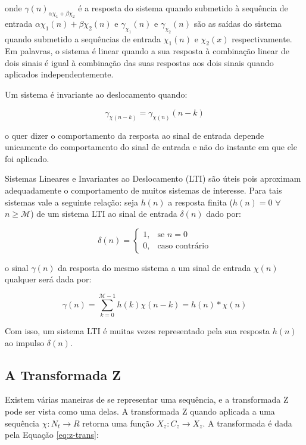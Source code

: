 {onde $\gamma(n)_{\alpha \chi_1 + \beta \chi_2}$ é a resposta do sistema quando submetido à
sequência de entrada $\alpha \chi_1(n) + \beta \chi_2(n)$ e $\gamma_{\chi_1}(n)$ e
$\gamma_{\chi_2}(n)$ são as saídas do sistema quando submetido a sequências de entrada
$\chi_1(n)$ e $\chi_2(x)$ respectivamente. Em palavras, o sistema é linear quando a
sua resposta à combinação linear de dois sinais é igual à combinação das
suas respostas aos dois sinais quando aplicados independentemente. 

Um sistema é invariante ao deslocamento quando:

\begin{equation}
\gamma_{\chi(n-k)} = \gamma_{\chi(n)}(n - k)
\end{equation}

o quer dizer o comportamento da resposta ao sinal de entrada depende unicamente
do comportamento do sinal de entrada e não do instante em que ele foi aplicado.

Sistemas Lineares e Invariantes ao Deslocamento (LTI) são úteis pois aproximam
adequadamente o comportamento de muitos sistemas de interesse. Para tais
sistemas vale a seguinte relação: seja $h(n)$ a resposta finita ($h(n) = 0$ $\forall$ $n \geq \mathcal{M}$) de um sistema  LTI ao sinal de entrada $\delta(n)$ dado por:

\begin{equation}
    \delta(n)= 
\begin{cases}
    1,& \text{se } n = 0\\
    0,              & \text{caso contrário}
\end{cases}
\end{equation}

o sinal $\gamma(n)$ da resposta do mesmo sistema a um sinal de entrada $\chi(n)$ qualquer
será dada por:

\begin{equation}
\gamma(n) = \sum_{k=0} ^{\mathcal{M}-1} h(k)\chi(n-k) = h(n) * \chi(n)
\end{equation}

Com isso, um sistema LTI é muitas vezes representado pela sua resposta $h(n)$ ao
impulso $\delta(n)$.



\subsection{A Transformada Z}

Existem várias maneiras de se representar uma sequência, e a transformada Z pode
ser vista como uma delas. A transformada Z quando aplicada a uma sequência
$\chi:N_t\rightarrow R$ retorna uma função $X_z:C_z\rightarrow X_z$. A transformada é dada
pela Equação \ref{eq:z-trans}:

}
